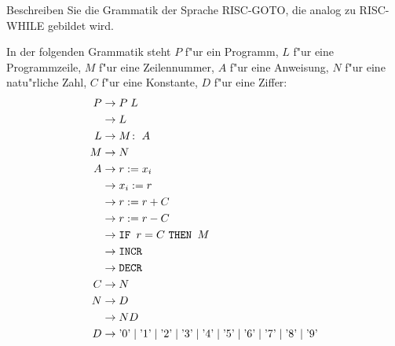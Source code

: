Beschreiben Sie die Grammatik der Sprache RISC-GOTO, die analog zu
RISC-WHILE gebildet wird.

\begin{loesung}
In der folgenden Grammatik steht $P$ f"ur ein Programm, $L$ f"ur
eine Programmzeile, $M$ f"ur eine Zeilennummer, $A$ f"ur eine
Anweisung, $N$ f"ur eine natu"rliche Zahl, $C$ f"ur eine Konstante,
$D$ f"ur eine Ziffer:
\begin{align*}
P&\rightarrow P\; L\\
 &\rightarrow L\\
L&\rightarrow M\colon \; A\\
M&\rightarrow N\\
A&\rightarrow r := x_i\\
 &\rightarrow x_i := r\\
 &\rightarrow r := r + C\\
 &\rightarrow r := r - C\\
 &\rightarrow \text{\tt IF } r = C \text{ \tt THEN } M\\
 &\rightarrow \texttt{INCR}\\
 &\rightarrow \texttt{DECR}\\
C&\rightarrow N\\
N&\rightarrow D\\
 &\rightarrow ND\\
D&\rightarrow
\text{'0'}\;|\;
\text{'1'}\;|\;
\text{'2'}\;|\;
\text{'3'}\;|\;
\text{'4'}\;|\;
\text{'5'}\;|\;
\text{'6'}\;|\;
\text{'7'}\;|\;
\text{'8'}\;|\;
\text{'9'}
\end{align*}
\end{loesung}
